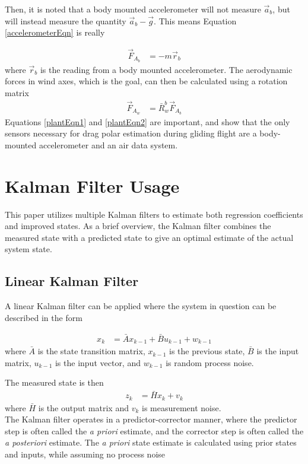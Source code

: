 Then, it is noted that a body mounted accelerometer will not measure $\vec{a}_b$, but will instead measure the quantity $\vec{a}_b - \vec{g}$. This means Equation \ref{accelerometerEqn} is really

\begin{align}
\label{plantEqn1}
\vec{F}_{A_b} &= -m\vec{r}_b
\end{align}
where $\vec{r}_b$ is the reading from a body mounted accelerometer. The aerodynamic forces in wind axes, which is the goal, can then be calculated using a rotation matrix
\begin{align}
\label{plantEqn2}
\vec{F}_{A_w} &= \bar{R}^b_w\vec{F}_{A_b}
\end{align}
Equations \ref{plantEqn1} and \ref{plantEqn2} are important, and show that the only sensors necessary for drag polar estimation during gliding flight are a body-mounted accelerometer and an air data system.

\section{Kalman Filter Usage}
\label{kalman-filter}
This paper utilizes multiple Kalman filters to estimate both regression coefficients and improved states. As a brief overview, the Kalman filter combines the measured state with a predicted state to give an optimal\cite{kalman60} estimate of the actual system state.

\subsection*{Linear Kalman Filter}
A linear Kalman filter can be applied\cite{welch1995introduction} where the system in question can be described in the form 

\begin{align}
x_k &= \bar{A}x_{k-1} + \bar{B}u_{k-1}+w_{k-1}
\end{align}
\noindent
where $\bar{A}$ is the state transition matrix, $x_{k-1}$ is the previous state, $\bar{B}$ is the input matrix, $u_{k-1}$ is the input vector, and $w_{k-1}$ is random process noise.

The measured state is then 
\begin{align}
z_k &= \bar{H}x_k+v_k
\end{align} 
\noindent
where $\bar{H}$ is the output matrix and $v_k$ is measurement noise.\\
The Kalman filter operates in a predictor-corrector manner, where the predictor step is often called the \textit{a priori} estimate, and the corrector step is often called the \textit{a posteriori} estimate. The \textit{a priori} state estimate is calculated using prior states and inputs, while assuming no process noise

